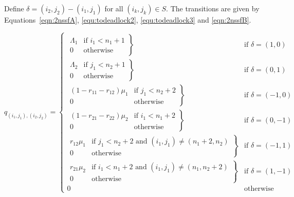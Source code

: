 \documentclass{article}
\numberwithin{equation}{section}
\begin{document}
Define $\delta = (i_2, j_2) - (i_1, j_1)$ for all $(i_k, j_k) \in S$.
The transitions are given by Equations~\ref{eqn:2nssfA}, \ref{equ:todeadlock2},
\ref{equ:todeadlock3} and \ref{eqn:2nssfB}.

\begin{equation}\label{eqn:2nssfA}
  q_{(i_1, j_1),(i_2, j_2)} = \left\{
  \begin{array}{rr}
    \left. \begin{array}{rr}
      \Lambda_1 & \text{if } i_1 < n_1 + 1 \\
      0 & \text{otherwise}
    \end{array} \right\} & \text{if } \delta = (1, 0) \\
    \left. \begin{array}{rr}
      \Lambda_2 & \text{if } j_1 < n_2 + 1 \\
      0 & \text{otherwise}
    \end{array} \right\} & \text{if } \delta = (0, 1) \\
    \left. \begin{array}{rr}
      (1 - r_{11} - r_{12})\mu_1 & \text{if } j_1 < n_2 + 2 \\
      0 & \text{otherwise}
    \end{array} \right\} & \text{if } \delta = (-1, 0) \\
    \left. \begin{array}{rr}
      (1 - r_{21} - r_{22})\mu_2 & \text{if } i_1 < n_1 + 2 \\
      0 & \text{otherwise}
    \end{array} \right\} & \text{if } \delta = (0, -1) \\
    \left. \begin{array}{rr}
      r_{12}\mu_1 & \text{if } j_1 < n_2 + 2 \text{ and } (i_1, j_1) \neq (n_1 + 2, n_2) \\
      0 & \text{otherwise}
    \end{array} \right\} & \text{if } \delta = (-1, 1) \\
    \left. \begin{array}{rr}
      r_{21}\mu_2 & \text{if } i_1 < n_1 + 2 \text{ and } (i_1, j_1) \neq (n_1, n_2 + 2) \\
      0 & \text{otherwise}
    \end{array} \right\} & \text{if } \delta = (1, -1) \\
    0 & \text{otherwise}
  \end{array} \right.
\end{equation}
\end{document}
